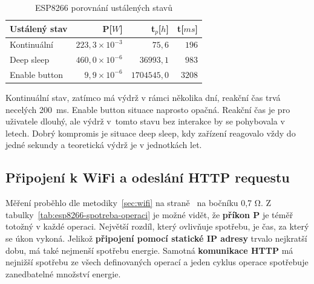 \documentclass[a4paper, 12pt]{report}
\begin{document}
    \begin{table}[h!]
        \centering
        \caption{ESP8266 porovnání ustálených stavů}
        \begin{tabular}{||l|r r r||}
            \hline
            Ustálený stav & P[$W$]                 & t$_{p}$[$h$]  & t[$ms$] \\
            \hline
            Kontinuální   & $223,3 \times 10^{-3}$ & $75,6$        & $196$   \\
            Deep sleep    & $460,0 \times 10^{-6}$ & $36 993,1$    & $983$   \\
            Enable button & $9,9\times 10^{-6}$    & $1 704 545,0$ & $3 208$ \\
            \hline
        \end{tabular}
        \label{tab:esp8266-klidove-rezimy-porovnani}
    \end{table}
    Kontinuální stav, zatímco má výdrž v rámci několika dní, reakční čas trvá necelých 200~ms.
    Enable button situace naprosto opačná.
    Reakční čas je pro uživatele dlouhý, ale výdrž v~tomto stavu bez interakce by se pohybovala v letech.
    Dobrý kompromis je situace deep sleep, kdy zařízení reagovalo vždy do jedné sekundy a teoretická výdrž je v jednotkách let.\\

    \subsection{Připojení k WiFi a odeslání HTTP requestu}
    Měření proběhlo dle metodiky~\ref{sec:wifi} na straně~\pageref{sec:wifi} na bočníku 0,7 \si{\ohm}.
    Z tabulky~\ref{tab:esp8266-spotreba-operaci} je možné vidět, že \textbf{příkon P} je téměř totožný v každé operaci.
    Největší rozdíl, který ovlivňuje spotřebu, je čas, za který se úkon vykoná.
    Jelikož \textbf{připojení pomocí statické IP adresy} trvalo nejkratší dobu, má také nejmenší spotřebu energie.
    Samotná \textbf{komunikace HTTP} má nejnižší spotřebu ze všech definovaných operací a jeden cyklus operace spotřebuje zanedbatelné množství energie.
    \newpage
\end{document}
